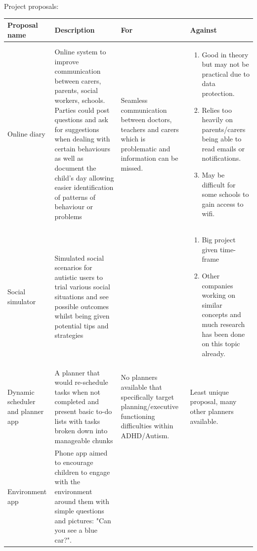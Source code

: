 \documentclass[11pt]{report}
\begin{document}
Project proposals:
\begin{table}[H]
    \begin{tabular}{| p{2cm} | p{5cm} | p{4cm}| p{6cm} |}
    \hline
    Proposal name & Description &  For & Against \\
    \hline
    \hline
    Online diary & Online system to improve communication between carers, parents, social workers, schools. Parties could post questions and ask for suggestions when dealing with certain behaviours as well as document the child's day allowing easier identification of patterns of behaviour or problems & 
   Seamless communication between doctors, teachers and carers which is problematic and information can be missed.
   & \begin{minipage}{5cm}
    \vskip 4pt
    \begin{enumerate}
   \item Good in theory but may not be practical due to data protection.
   \item Relies too heavily on parents/carers being able to read emails or notifications.
   \item May be difficult for some schools to gain access to wifi.
   \end{enumerate}
   \vskip 4pt
 \end{minipage}                        \\
    \hline
    Social simulator & Simulated social scenarios for autistic users to trial various social situations and see possible outcomes whilst being given potential tips and strategies & & \begin{minipage}{5cm}
    \vskip 4pt
    \begin{enumerate}
   \item Big project given time-frame
   \item Other companies working on similar concepts and much research has been done on this topic already.
   \end{enumerate}
   \vskip 4pt
 \end{minipage}     \\
    \hline
    Dynamic scheduler and planner app & A planner that would re-schedule tasks when not completed and present basic to-do lists with tasks broken down into manageable chunks &
    No planners available that specifically target planning/executive functioning difficulties within ADHD/Autism.
  &
Least unique proposal, many other planners available.
  \\
    \hline
    Environment app & Phone app aimed to encourage children to engage with the environment around them with simple questions and pictures: "Can you see a blue car?".  & 

\end{tabular}
\end{table}
\end{document}
